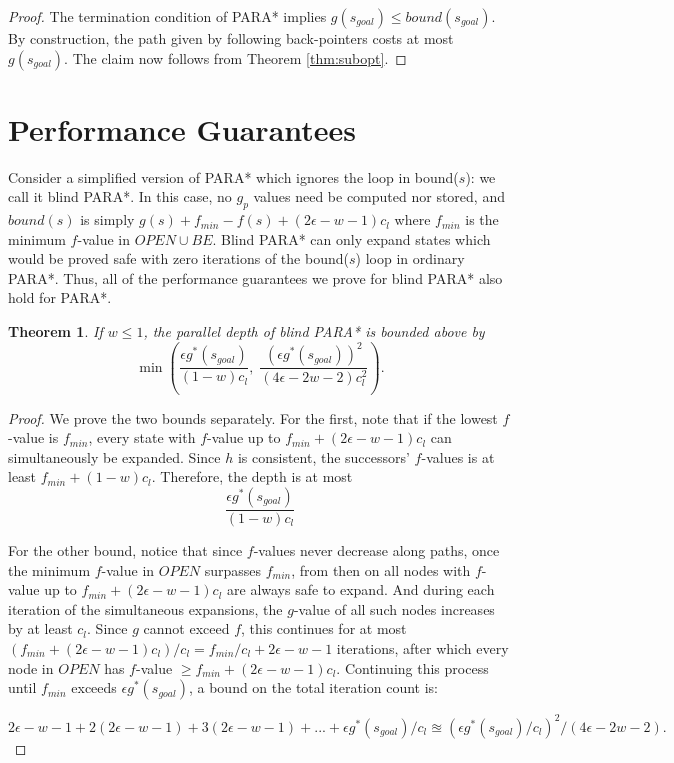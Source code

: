 \documentclass[letterpaper]{article}
\newtheorem{thm}{Theorem}
\begin{document}
\begin{proof}
The termination condition of PARA* implies $g(s_{goal}) \le bound(s_{goal})$. By construction, the path given by following back-pointers costs at most $g(s_{goal})$. The claim now follows from Theorem \ref{thm:subopt}.
\end{proof}

\section{Performance Guarantees}

Consider a simplified version of PARA* which ignores the loop in bound($s$): we call it blind PARA*. In this case, no $g_p$ values need be computed nor stored, and $bound(s)$ is simply $g(s) + f_{min} - f(s) + (2\epsilon-w-1)c_l$ where $f_{min}$ is the minimum $f$-value in $OPEN \cup BE$. Blind PARA* can only expand states which would be proved safe with zero iterations of the bound($s$) loop in ordinary PARA*. Thus, all of the performance guarantees we prove for blind PARA* also hold for PARA*. 

\begin{thm}
\label{thm:depth}
If $w \le 1$, the parallel depth of blind PARA* is bounded above by
\[\min\left(\frac{\epsilon g^*(s_{goal})}{(1-w)c_l},\;
\frac{\left(\epsilon g^*(s_{goal})\right)^2 }{(4\epsilon-2w-2)c_l^2}\right).\]
\end{thm}

\begin{proof}
We prove the two bounds separately. For the first, note that if the lowest $f$-value is $f_{min}$, every state with $f$-value up to $f_{min} + (2\epsilon-w-1)c_l$ can simultaneously be expanded. Since $h$ is consistent, the successors' $f$-values is at least $f_{min} + (1-w)c_l$. Therefore, the depth is at most
\[\frac{\epsilon g^*(s_{goal})}{(1-w)c_l}\]

For the other bound, notice that since $f$-values never decrease along paths, once the minimum $f$-value in $OPEN$ surpasses $f_{min}$, from then on all nodes with $f$-value up to $f_{min} + (2\epsilon-w-1)c_l$ are always safe to expand. And during each iteration of the simultaneous expansions, the $g$-value of all such nodes increases by at least $c_l$. Since $g$ cannot exceed $f$, this continues for at most $(f_{min} + (2\epsilon-w-1)c_l) / c_l = f_{min}/c_l + 2\epsilon-w-1$ iterations, after which every node in $OPEN$ has $f$-value $\ge f_{min} + (2\epsilon-w-1)c_l$. Continuing this process until $f_{min}$ exceeds $\epsilon g^*(s_{goal})$, a bound on the total iteration count is:

$2\epsilon-w-1 + 2(2\epsilon-w-1) + 3(2\epsilon-w-1) + ... + \epsilon g^*(s_{goal})/c_l
\approxeq (\epsilon g^*(s_{goal})/c_l )^2 / ( 4\epsilon-2w-2 ).$
\end{proof}
\end{document}
